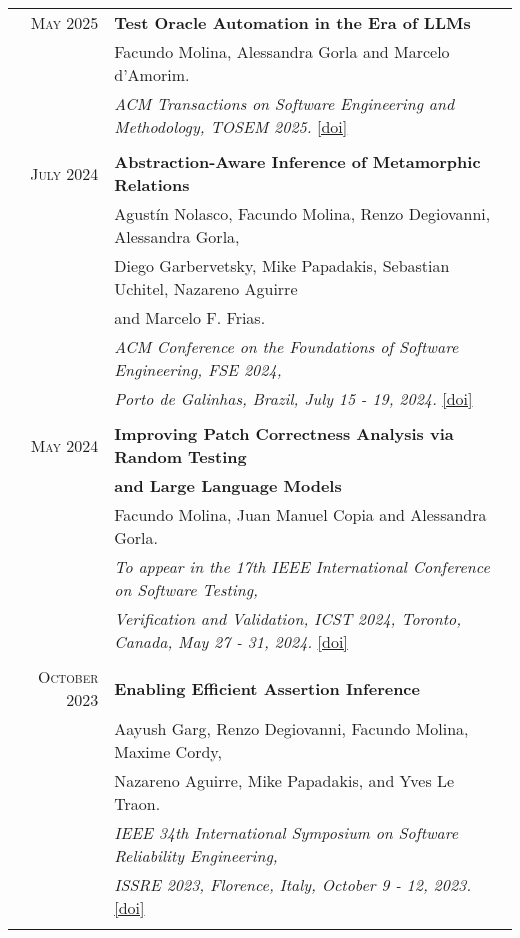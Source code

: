 \documentclass[a4paper,10pt]{article} %
\begin{document}
\begin{longtable}{rl}

\textsc{May} 2025  & \textbf{Test Oracle Automation in the Era of LLMs} \\
        & Facundo Molina, Alessandra Gorla and Marcelo d'Amorim. \\ 
        & \textit{ACM Transactions on Software Engineering and Methodology, TOSEM 2025.} \href{https://dl.acm.org/doi/10.1145/3715107}{[doi]} \\ & \\

\textsc{July} 2024  & \textbf{Abstraction-Aware Inference of Metamorphic Relations} \\
        & Agustín Nolasco, Facundo Molina, Renzo Degiovanni, Alessandra Gorla, \\ 
        & Diego Garbervetsky, Mike Papadakis, Sebastian Uchitel, Nazareno Aguirre \\
        & and Marcelo F. Frias. \\
        & \textit{ACM Conference on the Foundations of Software Engineering, FSE 2024,} \\
        & \textit{Porto de Galinhas, Brazil, July 15 - 19, 2024.} \href{https://dl.acm.org/doi/10.1145/3643747}{[doi]} \\ & \\

\textsc{May} 2024  & \textbf{Improving Patch Correctness Analysis via Random Testing} \\
        & \textbf{and Large Language Models} \\
        & Facundo Molina, Juan Manuel Copia and Alessandra Gorla. \\
        & \textit{To appear in the 17th IEEE International Conference on Software Testing,} \\
        & \textit{Verification and Validation, ICST 2024, Toronto, Canada, May 27 - 31, 2024.} \href{https://ieeexplore.ieee.org/document/10638611/}{[doi]} \\ & \\

\textsc{October} 2023  & \textbf{Enabling Efficient Assertion Inference} \\
        & Aayush Garg, Renzo Degiovanni, Facundo Molina, Maxime Cordy,\\
        & Nazareno Aguirre, Mike Papadakis, and Yves Le Traon. \\
        & \textit{IEEE 34th International Symposium on Software Reliability Engineering,} \\
        & \textit{ISSRE 2023, Florence, Italy, October 9 - 12, 2023.} \href{https://doi.ieeecomputersociety.org/10.1109/ISSRE59848.2023.00039}{[doi]}\\ & \\


\end{longtable}
\end{document}
